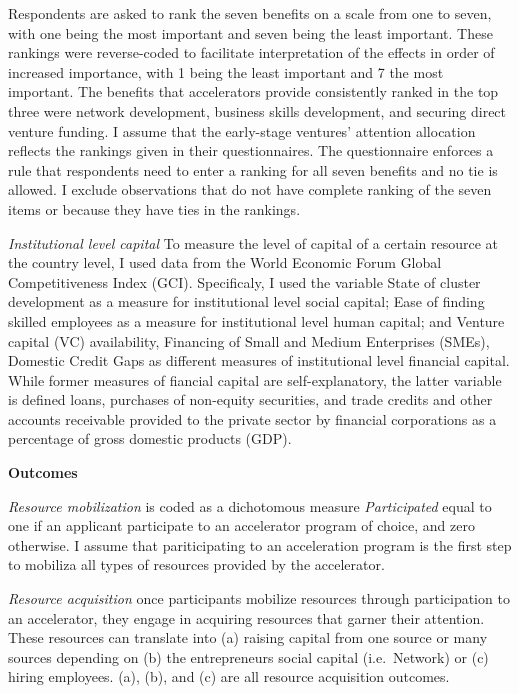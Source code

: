 \documentclass[
  english,
  man]{apa6}
\begin{document}
Respondents are asked to rank the seven benefits on a scale from one to seven, with one being the most important and seven being the least important. These rankings were reverse-coded to facilitate interpretation of the effects in order of increased importance, with 1 being the least important and 7 the most important. The benefits that accelerators provide consistently ranked in the top three were network development, business skills development, and securing direct venture funding. I assume that the early-stage ventures' attention allocation reflects the rankings given in their questionnaires. The questionnaire enforces a rule that respondents need to enter a ranking for all seven benefits and no tie is allowed. I exclude observations that do not have complete ranking of the seven items or because they have ties in the rankings.

\emph{Institutional level capital} To measure the level of capital of a certain resource at the country level, I used data from the World Economic Forum Global Competitiveness Index (GCI). Specificaly, I used the variable State of cluster development as a measure for institutional level social capital; Ease of finding skilled employees as a measure for institutional level human capital; and Venture capital (VC) availability, Financing of Small and Medium Enterprises (SMEs), Domestic Credit Gaps as different measures of institutional level financial capital. While former measures of fiancial capital are self-explanatory, the latter variable is defined loans, purchases of non-equity securities, and trade credits and other accounts receivable provided to the private sector by financial corporations as a percentage of gross domestic products (GDP).

\textbf{Outcomes}

\emph{Resource mobilization} is coded as a dichotomous measure \emph{Participated} equal to one
if an applicant participate to an accelerator program of choice, and zero otherwise. I assume that pariticipating to an acceleration program is the first step to mobiliza all types of resources provided by the accelerator.

\emph{Resource acquisition} once participants mobilize resources through participation to an accelerator, they engage in acquiring resources that garner their attention. These resources can translate into (a) raising capital from one source or many sources depending on (b) the entrepreneurs social capital (i.e.~Network) or (c) hiring employees. (a), (b), and (c) are all resource acquisition outcomes.
\end{document}
